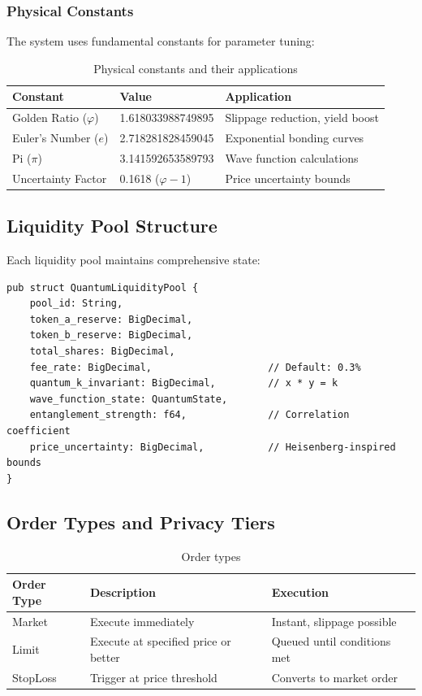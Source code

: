 \documentclass[11pt,a4paper]{article}
\begin{document}
\subsubsection{Physical Constants}

The system uses fundamental constants for parameter tuning:

\begin{table}[H]
\centering
\begin{tabular}{llp{6cm}}
\toprule
\textbf{Constant} & \textbf{Value} & \textbf{Application} \\
\midrule
Golden Ratio ($\varphi$) & 1.618033988749895 & Slippage reduction, yield boost \\
Euler's Number ($e$) & 2.718281828459045 & Exponential bonding curves \\
Pi ($\pi$) & 3.141592653589793 & Wave function calculations \\
Uncertainty Factor & 0.1618 ($\varphi - 1$) & Price uncertainty bounds \\
\bottomrule
\end{tabular}
\caption{Physical constants and their applications}
\end{table}

\subsection{Liquidity Pool Structure}

Each liquidity pool maintains comprehensive state:

\begin{lstlisting}[style=rust]
pub struct QuantumLiquidityPool {
    pool_id: String,
    token_a_reserve: BigDecimal,
    token_b_reserve: BigDecimal,
    total_shares: BigDecimal,
    fee_rate: BigDecimal,                    // Default: 0.3%
    quantum_k_invariant: BigDecimal,         // x * y = k
    wave_function_state: QuantumState,
    entanglement_strength: f64,              // Correlation coefficient
    price_uncertainty: BigDecimal,           // Heisenberg-inspired bounds
}
\end{lstlisting}

\subsection{Order Types and Privacy Tiers}

\begin{table}[H]
\centering
\begin{tabular}{llp{7cm}}
\toprule
\textbf{Order Type} & \textbf{Description} & \textbf{Execution} \\
\midrule
Market & Execute immediately & Instant, slippage possible \\
Limit & Execute at specified price or better & Queued until conditions met \\
StopLoss & Trigger at price threshold & Converts to market order \\
\bottomrule
\end{tabular}
\caption{Order types}
\end{table}
\end{document}
